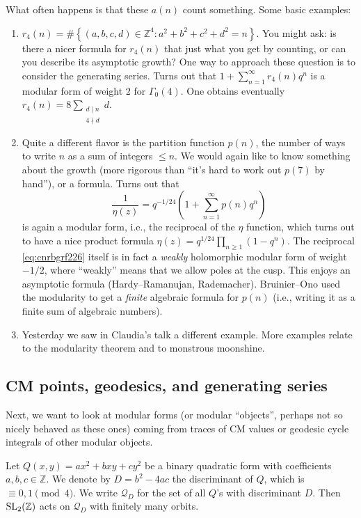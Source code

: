\documentclass[reqno]{amsart} 
\numberwithin{theorem}{section}
\numberwithin{equation}{section}
\begin{document}
What often happens is that these $a(n)$ count something.  Some basic examples:
\begin{enumerate}
\item $r_4(n) = \# \left\{(a, b, c, d) \in \mathbb{Z}^4 : a^2 + b^2 + c^2 + d^2 = n \right\}$.  You might ask: is there a nicer formula for $r_4(n)$ that just what you get by counting, or can you describe its asymptotic growth?  One way to approach these question is to consider the generating series.  Turns out that $1 + \sum_{n = 1}^\infty r_4(n) q^n$ is a modular form of weight $2$ for $\Gamma_0(4)$.  One obtains eventually $r_4(n) = 8 \sum_{ \substack{
      d \mid n  \\
      4 \nmid d      
    } }d$.
\item Quite a different flavor is the partition function $p(n)$, the number of ways to write $n$ as a sum of integers $\leq n$.  We would again like to know something about the growth (more rigorous than ``it's hard to work out $p(7)$ by hand''), or a formula.  Turns out that
  \begin{equation}\label{eq:cnrbgrf226}
    \frac{1}{\eta(z)} = q^{- 1/24} \left( 1 + \sum_{n = 1}^\infty p(n) q^n \right)
  \end{equation}
  is again a modular form, i.e., the reciprocal of the $\eta$ function, which turns out to have a nice product formula $\eta(z) = q^{1/24} \prod_{n \geq 1}(1 - q^n)$.  The reciprocal \eqref{eq:cnrbgrf226} itself is in fact a \emph{weakly} holomorphic modular form of weight $- 1/2$, where ``weakly'' means that we allow poles at the cusp.  This enjoys an asymptotic formula (Hardy--Ramanujan, Rademacher).  Bruinier--Ono used the modularity to get a \emph{finite} algebraic formula for $p(n)$ (i.e., writing it as a finite sum of algebraic numbers).  
\item Yesterday we saw in Claudia's talk a different example.  More examples relate to the modularity theorem and to monstrous moonshine.
\end{enumerate}

\subsection{CM points, geodesics, and generating series}

Next, we want to look at modular forms (or modular ``objects'', perhaps not so nicely behaved as these ones) coming from traces of CM values or geodesic cycle integrals of other modular objects.

Let $Q(x, y) = a x^2 + b x y + c y^2$ be a binary quadratic form with coefficients $a, b, c \in \mathbb{Z}$.  We denote by $D = b^2 - 4 a c$ the discriminant of $Q$, which is $\equiv 0, 1 \pmod{4}$.  We write $\mathcal{Q}_D$ for the set of all $Q$'s with discriminant $D$.  Then $\operatorname{SL}_2(\mathbb{Z})$ acts on $\mathcal{Q}_D$ with finitely many orbits.
\end{document}
